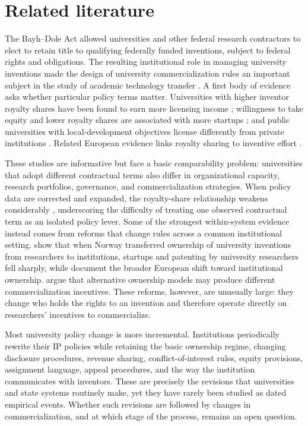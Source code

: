\section{Related literature}\label{sec:lit}

The Bayh--Dole Act allowed universities and other federal research contractors to elect to retain title to qualifying federally funded inventions, subject to federal rights and obligations. The resulting institutional role in managing university inventions made the design of university commercialization rules an important subject in the study of academic technology transfer \citep{MoweryEtAl2001,HendersonJaffeTrajtenberg1998,Sampat2006,GrimaldiEtAl2011}. A first body of evidence asks whether particular policy terms matter. Universities with higher inventor royalty shares have been found to earn more licensing income \citep{LachSchankerman2008}; willingness to take equity and lower royalty shares are associated with more startups \citep{DiGregorioShane2003}; and public universities with local-development objectives license differently from private institutions \citep{BelenzonSchankerman2009}. Related European evidence links royalty sharing to inventive effort \citep{ArqueCastellsEtAl2016}.

These studies are informative but face a basic comparability problem: universities that adopt different contractual terms also differ in organizational capacity, research portfolios, governance, and commercialization strategies. When policy data are corrected and expanded, the royalty-share relationship weakens considerably \citep{OuelletteTutt2020}, underscoring the difficulty of treating one observed contractual term as an isolated policy lever. Some of the strongest within-system evidence instead comes from reforms that change rules across a common institutional setting. \citet{HvideJones2018} show that when Norway transferred ownership of university inventions from researchers to institutions, startups and patenting by university researchers fell sharply, while \citet{GeunaRossi2011} document the broader European shift toward institutional ownership. \citet{KenneyPatton2009} argue that alternative ownership models may produce different commercialization incentives. These reforms, however, are unusually large: they change who holds the rights to an invention and therefore operate directly on researchers' incentives to commercialize.

Most university policy change is more incremental. Institutions periodically rewrite their IP policies while retaining the basic ownership regime, changing disclosure procedures, revenue sharing, conflict-of-interest rules, equity provisions, assignment language, appeal procedures, and the way the institution communicates with inventors. These are precisely the revisions that universities and state systems routinely make, yet they have rarely been studied as dated empirical events. Whether such revisions are followed by changes in commercialization, and at which stage of the process, remains an open question.

